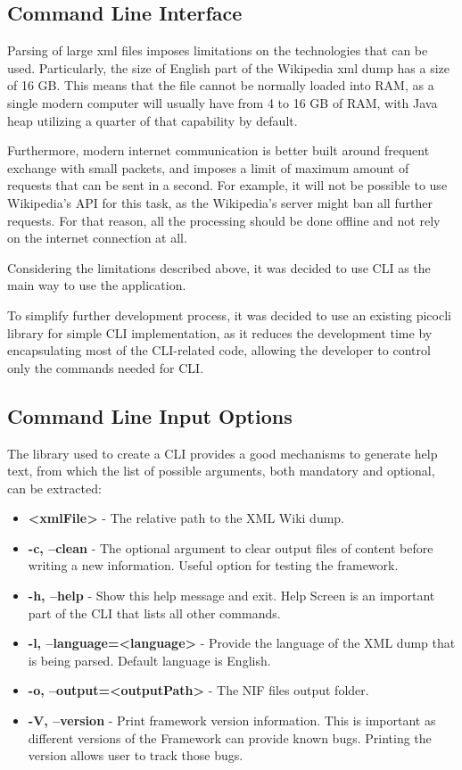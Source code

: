 \documentclass[thesis=M,english,hidelinks]{FITthesis}[2019/12/23]
\begin{document}
\subsection{Command Line Interface}

Parsing of large xml files imposes limitations on the technologies that can be used. Particularly, the size of English part of the Wikipedia xml dump has a size of 16 GB. This means that the file cannot be normally loaded into \gls{RAM}, as a single modern computer will usually have from 4 to 16 GB of \gls{RAM}, with Java heap utilizing a quarter of that capability by default. 

Furthermore, modern internet communication is better built around frequent exchange with small packets, and imposes a limit of maximum amount of requests that can be sent in a second. For example, it will not be possible to use Wikipedia's API for this task, as the Wikipedia's server might ban all further requests. For that reason, all the processing should be done offline and not rely on the internet connection at all.

Considering the limitations described above, it was decided to use \gls{CLI} as the main way to use the application. 

To simplify further development process, it was decided to use an existing picocli library for simple CLI implementation, as it reduces the development time by encapsulating most of the CLI-related code, allowing the developer to control only the commands needed for CLI.

\subsection{Command Line Input Options}

The library used to create a \gls{CLI} provides a good mechanisms to generate help text, from which the list of possible arguments, both mandatory and optional, can be extracted:

\begin{itemize}
	\item  \textbf{\textless xmlFile\textgreater} - The relative path to the XML Wiki dump.
	\item \textbf{-c, --clean} - The optional argument to clear output files of content before writing a new information. Useful option for testing the framework.
	\item \textbf{-h, --help} - Show this help message and exit. Help Screen is an important part of the CLI that lists all other commands.
	\item \textbf{-l, --language=\textless language\textgreater} - Provide the language of the XML dump that is being parsed. Default language is English.
	\item \textbf{-o, --output=\textless outputPath\textgreater} - The NIF files output folder.
	\item \textbf{-V, --version} - Print framework version information. This is important as different versions of the Framework can provide known bugs. Printing the version allows user to track those bugs.
\end{itemize}
\end{document}
